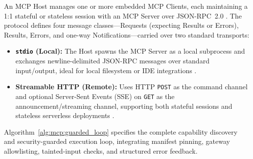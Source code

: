 \documentclass[../../../../master.tex]{subfiles}
\begin{document}
An MCP Host manages one or more embedded MCP Clients, each maintaining a 1:1 stateful or stateless session with an MCP Server over JSON-RPC~2.0 . The protocol defines four message classes---Requests (expecting Results or Errors), Results, Errors, and one-way Notifications---carried over two standard transports:
\begin{itemize}
  \item \textbf{\texttt{stdio} (Local):} The Host spawns the MCP Server as a local subprocess and exchanges newline-delimited JSON-RPC messages over standard input/output, ideal for local filesystem or IDE integrations .
  \item \textbf{Streamable HTTP (Remote):} Uses HTTP \texttt{POST} as the command channel and optional Server-Sent Events (SSE) on \texttt{GET} as the announcement/streaming channel, supporting both stateful sessions and stateless serverless deployments .
\end{itemize}

Algorithm~\ref{alg:mcp:guarded_loop} specifies the complete capability discovery and security-guarded execution loop, integrating manifest pinning, gateway allowlisting, tainted-input checks, and structured error feedback.
\end{document}
